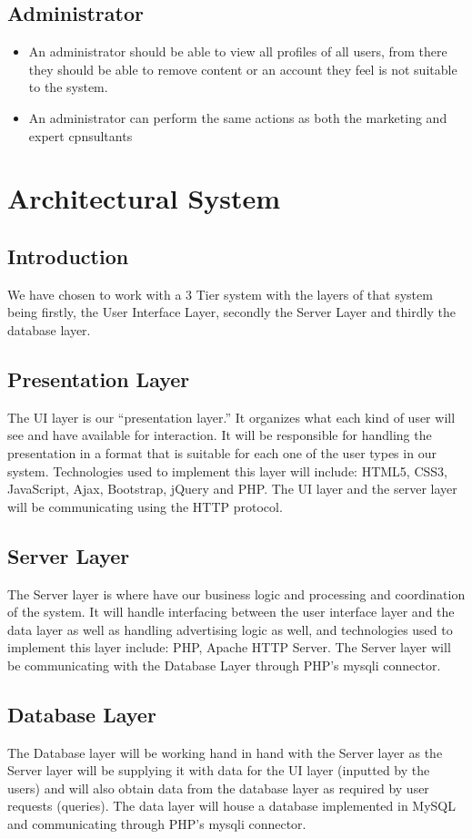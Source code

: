 \documentclass[10pt]{article}
\begin{document}
\subsection*{Administrator}
\begin{itemize}
\item An administrator should be able to view all profiles of all users, from there they should be able to remove content or an account they feel is not suitable to the system.
\item An administrator can perform the same actions as both the marketing and expert cpnsultants
\end{itemize}

\section*{Architectural System}
\subsection*{Introduction}
We have chosen to work with a 3 Tier system with the layers of that system being firstly, the User Interface Layer, secondly the Server Layer and thirdly the database layer.

\subsection*{Presentation Layer}
The UI layer is our “presentation layer.” It organizes what each kind of user will see and have available for interaction. It will be responsible for handling the presentation in a format that is suitable for each one of the user types in our system. Technologies used to implement this layer will include: HTML5, CSS3, JavaScript, Ajax, Bootstrap, jQuery and PHP. The UI layer and the server layer will be communicating using the HTTP protocol.
\subsection*{Server Layer}
The Server layer is where have our business logic and processing and coordination of the system. It will handle interfacing between the user interface layer and the data layer as well as handling advertising logic as well, and technologies used to implement this layer include: PHP, Apache HTTP Server. The Server layer will be communicating with the Database Layer through PHP's mysqli connector. 
\subsection*{Database Layer}
The Database layer will be working hand in hand with the Server layer as the Server layer will be supplying it with data for the UI layer (inputted by the users) and will also obtain data from the database layer as required by user requests (queries). The data layer will house a database implemented in MySQL and communicating through PHP's mysqli connector. 
\end{document}
